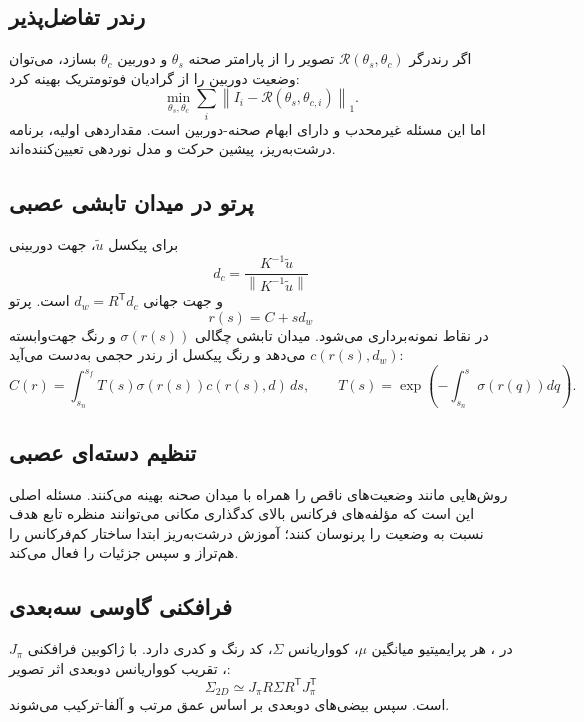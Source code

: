 \documentclass[12pt,openany,oneside]{book}
\newcommand{\norm}[1]{\left\lVert #1\right\rVert}
\newcommand{\trans}{^{\mathsf T}}
\begin{document}
\subsection{رندر تفاضل‌پذیر}
اگر رندرگر \(\mathcal R(\theta_s,\theta_c)\) تصویر را از پارامتر صحنه \(\theta_s\) و دوربین \(\theta_c\) بسازد،
می‌توان وضعیت دوربین را از گرادیان فوتومتریک بهینه کرد:
\begin{equation}
\min_{\theta_s,\theta_c}
\sum_i\norm{I_i-\mathcal R(\theta_s,\theta_{c,i})}_1.
\label{eq:differentiable-rendering}
\end{equation}
اما این مسئله غیرمحدب و دارای ابهام صحنه-دوربین است. مقداردهی اولیه، برنامه درشت‌به‌ریز، پیشین حرکت و مدل نوردهی تعیین‌کننده‌اند.

\subsection{پرتو در میدان تابشی عصبی}
برای پیکسل \(\widetilde u\)، جهت دوربینی
\begin{equation}
d_c=\frac{K^{-1}\widetilde u}{\norm{K^{-1}\widetilde u}}
\end{equation}
و جهت جهانی \(d_w=R\trans d_c\) است. پرتو
\begin{equation}
r(s)=C+s d_w
\end{equation}
در نقاط نمونه‌برداری می‌شود. میدان تابشی چگالی \(\sigma(r(s))\) و رنگ جهت‌وابسته \(c(r(s),d_w)\) می‌دهد و رنگ پیکسل از
رندر حجمی به‌دست می‌آید:
\begin{equation}
\widehat C(r)=\int_{s_n}^{s_f}T(s)\sigma(r(s))c(r(s),d)\,ds,
\qquad
T(s)=\exp\!\left(-\int_{s_n}^{s}\sigma(r(q))dq\right).
\label{eq:nerf-render}
\end{equation}

\subsection{تنظیم دسته‌ای عصبی}
روش‌هایی مانند  وضعیت‌های ناقص را همراه با میدان صحنه بهینه می‌کنند. مسئله اصلی این است که مؤلفه‌های فرکانس بالای
کدگذاری مکانی می‌توانند منظره تابع هدف نسبت به وضعیت را پرنوسان کنند؛ آموزش درشت‌به‌ریز ابتدا ساختار کم‌فرکانس را هم‌تراز
و سپس جزئیات را فعال می‌کند.

\subsection{فرافکنی گاوسی سه‌بعدی}
در ، هر پرایمیتیو میانگین \(\mu\)، کوواریانس \(\Sigma\)، کد رنگ و کدری دارد. با ژاکوبین فرافکنی
\(J_\pi\)، تقریب کوواریانس دوبعدی اثر تصویر:
\begin{equation}
\Sigma_{2D}\simeq J_\pi R\Sigma R\trans J_\pi\trans
\label{eq:gaussian-projection}
\end{equation}
است. سپس بیضی‌های دوبعدی بر اساس عمق مرتب و آلفا-ترکیب می‌شوند.
\end{document}
